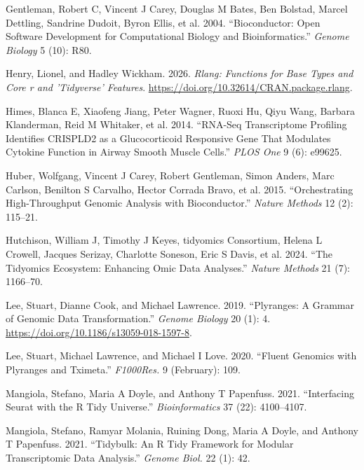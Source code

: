 \documentclass[
  letterpaper,
  DIV=11,
  numbers=noendperiod]{scrartcl}
\newlength{\cslhangindent}
\newenvironment{CSLReferences}[2] %
 {\begin{list}{}{%
  \setlength{\itemindent}{0pt}
  \setlength{\leftmargin}{0pt}
  \setlength{\parsep}{0pt}
  \ifodd #1
   \setlength{\leftmargin}{\cslhangindent}
   \setlength{\itemindent}{-1\cslhangindent}
  \fi
  \setlength{\itemsep}{#2\baselineskip}}}
 {\end{list}}
\begin{document}
\label{refs}
\begin{CSLReferences}{1}{0}
Gentleman, Robert C, Vincent J Carey, Douglas M Bates, Ben Bolstad,
Marcel Dettling, Sandrine Dudoit, Byron Ellis, et al. 2004.
{``Bioconductor: Open Software Development for Computational Biology and
Bioinformatics.''} \emph{Genome Biology} 5 (10): R80.

Henry, Lionel, and Hadley Wickham. 2026. \emph{Rlang: Functions for Base
Types and Core r and 'Tidyverse' Features}.
\url{https://doi.org/10.32614/CRAN.package.rlang}.

Himes, Blanca E, Xiaofeng Jiang, Peter Wagner, Ruoxi Hu, Qiyu Wang,
Barbara Klanderman, Reid M Whitaker, et al. 2014. {``{RNA-Seq}
Transcriptome Profiling Identifies {CRISPLD2} as a Glucocorticoid
Responsive Gene That Modulates Cytokine Function in Airway Smooth Muscle
Cells.''} \emph{PLOS One} 9 (6): e99625.

Huber, Wolfgang, Vincent J Carey, Robert Gentleman, Simon Anders, Marc
Carlson, Benilton S Carvalho, Hector Corrada Bravo, et al. 2015.
{``Orchestrating High-Throughput Genomic Analysis with Bioconductor.''}
\emph{Nature Methods} 12 (2): 115--21.

Hutchison, William J, Timothy J Keyes, tidyomics Consortium, Helena L
Crowell, Jacques Serizay, Charlotte Soneson, Eric S Davis, et al. 2024.
{``The Tidyomics Ecosystem: Enhancing Omic Data Analyses.''}
\emph{Nature Methods} 21 (7): 1166--70.

Lee, Stuart, Dianne Cook, and Michael Lawrence. 2019. {``Plyranges: A
Grammar of Genomic Data Transformation.''} \emph{Genome Biology} 20 (1):
4. \url{https://doi.org/10.1186/s13059-018-1597-8}.

Lee, Stuart, Michael Lawrence, and Michael I Love. 2020. {``Fluent
Genomics with Plyranges and Tximeta.''} \emph{F1000Res.} 9 (February):
109.

Mangiola, Stefano, Maria A Doyle, and Anthony T Papenfuss. 2021.
{``Interfacing Seurat with the {R} Tidy Universe.''}
\emph{Bioinformatics} 37 (22): 4100--4107.

Mangiola, Stefano, Ramyar Molania, Ruining Dong, Maria A Doyle, and
Anthony T Papenfuss. 2021. {``Tidybulk: An {R} Tidy Framework for
Modular Transcriptomic Data Analysis.''} \emph{Genome Biol.} 22 (1): 42.


\end{CSLReferences}
\end{document}

